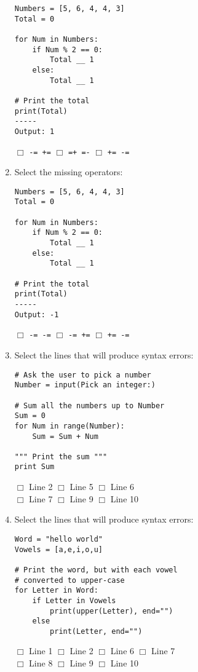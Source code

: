 \documentclass[11pt]{report}
\begin{document}
\begin{enumerate}
    \begin{verbatim}
Numbers = [5, 6, 4, 4, 3]
Total = 0

for Num in Numbers:
    if Num % 2 == 0:
        Total __ 1
    else:
        Total __ 1

# Print the total
print(Total)
-----
Output: 1
    \end{verbatim}
    $\Box$ {\tt -= +=} \hspace{3em} $\Box$ {\tt =+ =-} \hspace{3em} $\Box$ {\tt += -=}

    \item Select the missing operators:

    \begin{verbatim}
Numbers = [5, 6, 4, 4, 3]
Total = 0

for Num in Numbers:
    if Num % 2 == 0:
        Total __ 1
    else:
        Total __ 1

# Print the total
print(Total)
-----
Output: -1
    \end{verbatim}
    $\Box$ {\tt -= -=} \hspace{3em} $\Box$ {\tt -= +=} \hspace{3em} $\Box$ {\tt += -=}

    \item Select the lines that will produce syntax errors:

    \begin{verbatim}
# Ask the user to pick a number
Number = input(Pick an integer:)

# Sum all the numbers up to Number
Sum = 0
for Num in range(Number):
    Sum = Sum + Num

""" Print the sum """
print Sum
    \end{verbatim}
    $\Box$ Line 2 \hspace{3em} $\Box$ Line 5 \hspace{3em} $\Box$ Line 6\\
    $\Box$ Line 7 \hspace{3em} $\Box$ Line 9 \hspace{3em} $\Box$ Line 10

    \item Select the lines that will produce syntax errors:

    \begin{verbatim}
Word = "hello world"
Vowels = [a,e,i,o,u]

# Print the word, but with each vowel
# converted to upper-case
for Letter in Word:
    if Letter in Vowels
        print(upper(Letter), end="")
    else
        print(Letter, end="")
    \end{verbatim}
    $\Box$ Line 1 \hspace{3em} $\Box$ Line 2 \hspace{3em} $\Box$ Line 6 \hspace{3em}
    $\Box$ Line 7\\
    \hspace{3em} $\Box$ Line 8 \hspace{3em} $\Box$ Line 9 \hspace{3em} $\Box$ Line 10


\end{enumerate}
\end{document}
